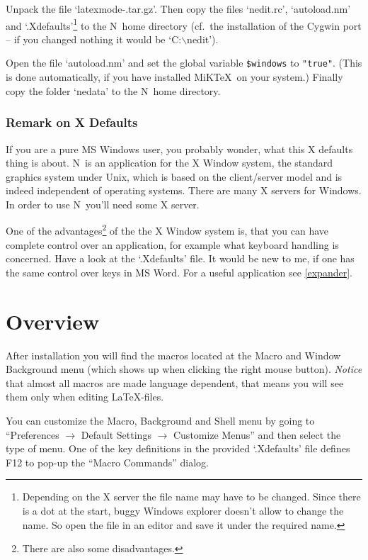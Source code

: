 \documentclass{article}
\newcommand{\nedit}{N\kern-0.8pt{Edit}}
\newcommand{\keyname}[1]{\textsc{#1}}
\newcommand{\file}[1]{`#1'}
\newcommand{\menu}[1]{``#1''}
\newcommand{\latexpackfile}{\file{latexmode-\lversion.tar.gz}}
\begin{document}
Unpack the file \latexpackfile. Then copy the files \file{nedit.rc}, \file{autoload.nm} and \file{.Xdefaults}\footnote{Depending on the X server the file name may have to be changed. Since there is a dot at the start, buggy Windows explorer doesn't allow to change the name. So open the file in an editor and save it under the required name.} to the \nedit\ home directory (cf.~the installation of the Cygwin port -- if you changed nothing it would be \file{C:$\backslash$nedit}).

Open  the file \file{autoload.nm} and set the global variable \verb|$windows| to \verb|"true"|. (This is done automatically, if you have installed MiK\TeX\ on your system.) Finally copy the folder \file{nedata} to the \nedit\ home directory.


\subsubsection{Remark on X Defaults}
If you are a pure MS Windows user, you probably wonder, what this X defaults thing is about. \nedit\ is an application for the X Window system, the standard graphics system under Unix, which is based on the client/server model and is indeed independent of operating systems. There are many X servers for Windows. In order to use \nedit\, you'll need some X server.

One of the advantages\footnote{There are also some disadvantages.} of the the X Window system is, that you can have complete control over an application, for example what keyboard handling is concerned. Have a look at the \file{.Xdefaults} file. It would be new to me, if one has the same control over keys in MS Word. For a useful application see \ref{expander}.


\newpage
\section{Overview}

After installation you will find the macros located at the Macro and Window Background menu (which shows up when clicking the right mouse button).
\emph{Notice} that almost all macros are made language dependent, that means you will see them only when editing \LaTeX-files.

You can customize the Macro, Background and Shell menu by going to \menu{Preferences $\to$ Default Settings $\to$ Customize Menus} and then select the type of menu. One of the key definitions in the provided \file{.Xdefaults} file defines \keyname{F12} to pop-up the \menu{Macro Commands} dialog.
\end{document}
